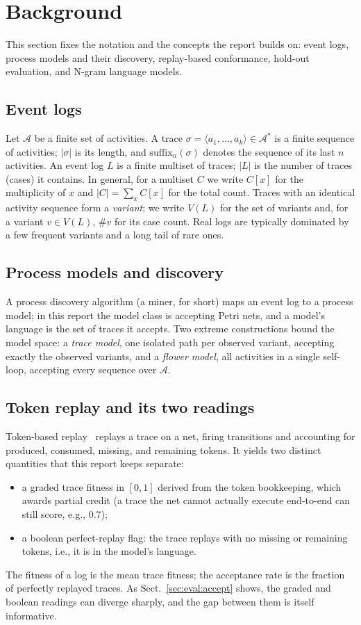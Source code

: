 \documentclass[runningheads]{llncs}
\begin{document}
\section{Background}
\label{sec:background}
This section fixes the notation and the concepts the report builds on: event logs, process models and their discovery, replay-based conformance, hold-out evaluation, and N-gram language models.

\subsection{Event logs}
Let $\mathcal{A}$ be a finite set of activities. A trace $\sigma=\langle a_1,\dots,a_k\rangle\in\mathcal{A}^{*}$ is a finite sequence of activities; $|\sigma|$ is its length, and $\mathrm{suffix}_n(\sigma)$ denotes the sequence of its last $n$ activities. An event log $L$ is a finite multiset of traces; $|L|$ is the number of traces (cases) it contains. In general, for a multiset $C$ we write $C[x]$ for the multiplicity of $x$ and $|C|=\sum_x C[x]$ for the total count. Traces with an identical activity sequence form a \emph{variant}; we write $V(L)$ for the set of variants and, for a variant $v\in V(L)$, $\#v$ for its case count. Real logs are typically dominated by a few frequent variants and a long tail of rare ones.

\subsection{Process models and discovery}
A process discovery algorithm (a miner, for short) maps an event log to a process model; in this report the model class is accepting Petri nets, and a model's language is the set of traces it accepts. Two extreme constructions bound the model space: a \emph{trace model}, one isolated path per observed variant, accepting exactly the observed variants, and a \emph{flower model}, all activities in a single self-loop, accepting every sequence over $\mathcal{A}$.

\subsection{Token replay and its two readings}
Token-based replay~\cite{rozinat2008conformance} replays a trace on a net, firing transitions and accounting for produced, consumed, missing, and remaining tokens. It yields two distinct quantities that this report keeps separate:
\begin{itemize}
  \item a graded trace fitness in $[0,1]$ derived from the token bookkeeping, which awards partial credit (a trace the net cannot actually execute end-to-end can still score, e.g., $0.7$);
  \item a boolean perfect-replay flag: the trace replays with no missing or remaining tokens, i.e., it is in the model's language.
\end{itemize}
The fitness of a log is the mean trace fitness; the acceptance rate is the fraction of perfectly replayed traces. As Sect.~\ref{sec:eval:accept} shows, the graded and boolean readings can diverge sharply, and the gap between them is itself informative.
\end{document}
